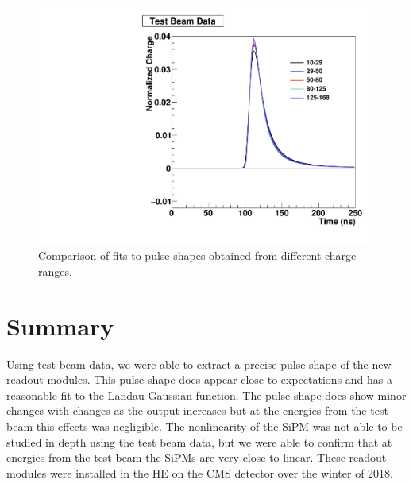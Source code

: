 \begin{figure}
\centering
\includegraphics[width=0.8\linewidth]{Figures/Overlap.pdf}
\caption{Comparison of fits to pulse shapes obtained from different charge ranges.}
\label{fig:Overlap}
\end{figure}


\section{Summary}

Using test beam data, we were able to extract a precise pulse shape of the new readout modules. This pulse shape does appear close to expectations and has a reasonable fit to the Landau-Gaussian function. The pulse shape does show minor changes with changes as the output increases but at the energies from the test beam this effects was negligible. The nonlinearity of the SiPM was not able to be studied in depth using the test beam data, but we were able to confirm that at energies from the test beam the SiPMs are very close to linear. These readout modules were installed in the HE on the CMS detector over the winter of 2018. 

